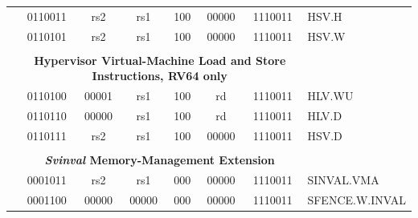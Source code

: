 \documentclass{../runikraft-report}
\begin{document}
{\begin{longtable}{p{0in}p{0.4in}p{0.05in}p{0.05in}p{0.05in}p{0.05in}p{0.4in}p{0.6in}p{0.4in}p{0.6in}p{0.7in}l}
    &
    \multicolumn{4}{|c|}{0110011} &
    \multicolumn{2}{c|}{rs2} &
    \multicolumn{1}{c|}{rs1} &
    \multicolumn{1}{c|}{100} &
    \multicolumn{1}{c|}{00000} &
    \multicolumn{1}{c|}{1110011} & HSV.H \\
    \cline{2-11}


    &
    \multicolumn{4}{|c|}{0110101} &
    \multicolumn{2}{c|}{rs2} &
    \multicolumn{1}{c|}{rs1} &
    \multicolumn{1}{c|}{100} &
    \multicolumn{1}{c|}{00000} &
    \multicolumn{1}{c|}{1110011} & HSV.W \\
    \cline{2-11}


    &
    \multicolumn{10}{c}{} & \\
    &
    \multicolumn{10}{c}{\bf Hypervisor Virtual-Machine Load and Store Instructions, RV64 only} & \\
    \cline{2-11}


    &
    \multicolumn{4}{|c|}{0110100} &
    \multicolumn{2}{c|}{00001} &
    \multicolumn{1}{c|}{rs1} &
    \multicolumn{1}{c|}{100} &
    \multicolumn{1}{c|}{rd} &
    \multicolumn{1}{c|}{1110011} & HLV.WU \\
    \cline{2-11}


    &
    \multicolumn{4}{|c|}{0110110} &
    \multicolumn{2}{c|}{00000} &
    \multicolumn{1}{c|}{rs1} &
    \multicolumn{1}{c|}{100} &
    \multicolumn{1}{c|}{rd} &
    \multicolumn{1}{c|}{1110011} & HLV.D \\
    \cline{2-11}


    &
    \multicolumn{4}{|c|}{0110111} &
    \multicolumn{2}{c|}{rs2} &
    \multicolumn{1}{c|}{rs1} &
    \multicolumn{1}{c|}{100} &
    \multicolumn{1}{c|}{00000} &
    \multicolumn{1}{c|}{1110011} & HSV.D \\
    \cline{2-11}


    &
    \multicolumn{10}{c}{} & \\
    &
    \multicolumn{10}{c}{\bf \emph{Svinval} Memory-Management Extension} & \\
    \cline{2-11}


    &
    \multicolumn{4}{|c|}{0001011} &
    \multicolumn{2}{c|}{rs2} &
    \multicolumn{1}{c|}{rs1} &
    \multicolumn{1}{c|}{000} &
    \multicolumn{1}{c|}{00000} &
    \multicolumn{1}{c|}{1110011} & SINVAL.VMA \\
    \cline{2-11}


    &
    \multicolumn{4}{|c|}{0001100} &
    \multicolumn{2}{c|}{00000} &
    \multicolumn{1}{c|}{00000} &
    \multicolumn{1}{c|}{000} &
    \multicolumn{1}{c|}{00000} &
    \multicolumn{1}{c|}{1110011} & SFENCE.W.INVAL \\
    \cline{2-11}



\end{longtable}}
\end{document}
